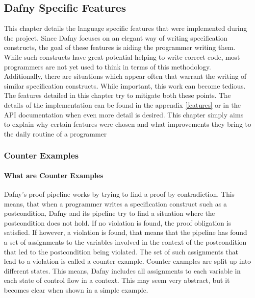 \subsection{Dafny Specific Features}\label{dffeatures}
This chapter details the language specific features that were implemented during the project. Since Dafny focuses on an elegant way of writing specification constructs, the goal of these features is  aiding the programmer writing them. While such constructs have great potential helping to write correct code, most programmers are not yet used to think in terms of this methodology. Additionally, there are situations which appear often that warrant the writing of similar specification constructs. While important, this work can become tedious. The features detailed in this chapter try to mitigate both these points. \newline
The details of the implementation can be found in the appendix \ref{features} or in the API documentation when even more detail is desired. This chapter simply aims to explain why certain features were chosen and what improvements they bring to the daily routine of a programmer \newline

\subsubsection{Counter Examples}
\paragraph{What are Counter Examples}
Dafny's proof pipeline works by trying to find a proof by contradiction. This means, that when a programmer writes a specification construct such as a postcondition, Dafny and its pipeline try to find a situation where the postcondition does not hold. If no violation is found, the proof obligation is satisfied. \newline
If however, a violation is found, that means that the pipeline has found a set of assignments to the variables involved in the context of the postcondition that led to the postcondition being violated. The set of such assignments that lead to a violation is called a counter example. \newline
Counter examples are split up into different states. This means, Dafny includes all assignments to each variable in each state of control flow in a context. This may seem very abstract, but it becomes clear when shown in a simple example. \newline

